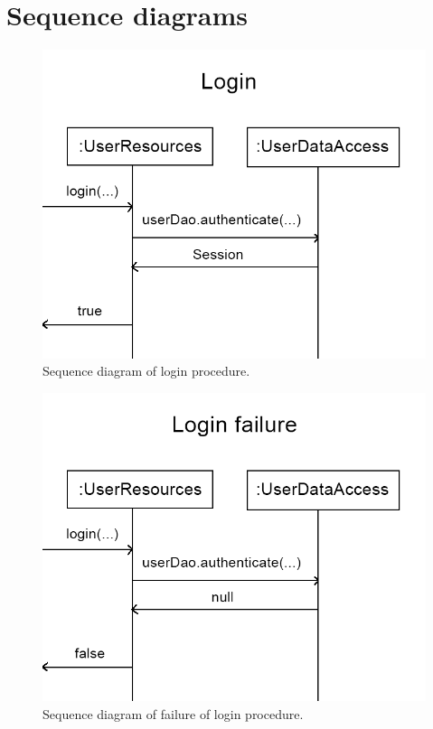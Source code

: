 \documentclass{article}
\begin{document}
\section{Sequence diagrams}

\begin{figure}[h]
  \centering
  \includegraphics[scale=0.3]{seqdiagram1.png}
  \caption{Sequence diagram of login procedure.}
  \label{fig:seq1}
\end{figure}

\begin{figure}[h]
  \centering
  \includegraphics[scale=0.3]{seqdiagram2.png}
  \caption{Sequence diagram of failure of login procedure.}
  \label{fig:seq2}
\end{figure}
\end{document}
